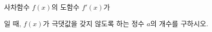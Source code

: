 사차함수 $f(x)$의 도함수 $f'(x)$가 \par\smallskip{}\par\smallskip\noindent 일 때, $f(x)$가 극댓값을 갖지 않도록 하는 정수 $a$의 개수를 구하시오.
